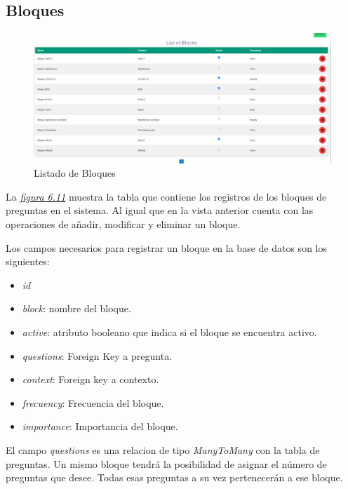\subsection{Bloques}

\begin{figure}[!ht]
    \centering
    \includegraphics[width=1\textwidth]{imagenes/list_bloques.png}
    \caption{Listado de Bloques}
    \label{fig:lista-bloques}
\end{figure}\vspace{1cm}

La \textit{\hyperref[fig:lista-bloques]{figura 6.11}} muestra la tabla que contiene los registros de los bloques de preguntas en el sistema. Al igual que en la vista anterior cuenta con las operaciones de añadir, modificar y eliminar un bloque. \vspace{0.3cm}

Los campos necesarios para registrar un bloque en la base de datos son los siguientes: \vspace{0.3cm}

\begin{itemize}
    \item \textit{id}
    \item \textit{block}: nombre del bloque.
    \item \textit{active}: atributo booleano que indica si el bloque se encuentra activo.
    \item \textit{questions}: Foreign Key a pregunta.
    \item \textit{context}: Foreign key a contexto.
    \item \textit{frecuency}: Frecuencia del bloque.
    \item \textit{importance}: Importancia del bloque.
\end{itemize}\vspace{0.3cm}

El campo \textit{questions} es una relacion de tipo \textit{ManyToMany} con la tabla de preguntas. Un mismo bloque tendrá la posibilidad de asignar el número de preguntas que desee. Todas esas preguntas a su vez pertenecerán a ese bloque.  

